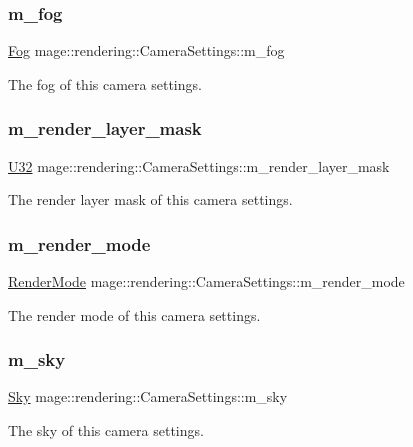 \subsubsection{\texorpdfstring{m\+\_\+fog}{m\_fog}}
{\footnotesize\ttfamily \hyperlink{classmage_1_1rendering_1_1_fog}{Fog} mage\+::rendering\+::\+Camera\+Settings\+::m\+\_\+fog\hspace{0.3cm}{\ttfamily [private]}}

The fog of this camera settings. \hypertarget{classmage_1_1rendering_1_1_camera_settings_ab6d4995fe7531563c5c5c8db1a0a1c9f}{}\label{classmage_1_1rendering_1_1_camera_settings_ab6d4995fe7531563c5c5c8db1a0a1c9f} 
\subsubsection{\texorpdfstring{m\+\_\+render\+\_\+layer\+\_\+mask}{m\_render\_layer\_mask}}
{\footnotesize\ttfamily \hyperlink{namespacemage_a41c104c036fba3756a74e19f793eeaa1}{U32} mage\+::rendering\+::\+Camera\+Settings\+::m\+\_\+render\+\_\+layer\+\_\+mask\hspace{0.3cm}{\ttfamily [private]}}

The render layer mask of this camera settings. \hypertarget{classmage_1_1rendering_1_1_camera_settings_adf563f8bd1ee5cecd126c6b4731de6e5}{}\label{classmage_1_1rendering_1_1_camera_settings_adf563f8bd1ee5cecd126c6b4731de6e5} 
\subsubsection{\texorpdfstring{m\+\_\+render\+\_\+mode}{m\_render\_mode}}
{\footnotesize\ttfamily \hyperlink{namespacemage_1_1rendering_aeb14ce7610cc9391f4e01be027b91dcc}{Render\+Mode} mage\+::rendering\+::\+Camera\+Settings\+::m\+\_\+render\+\_\+mode\hspace{0.3cm}{\ttfamily [private]}}

The render mode of this camera settings. \hypertarget{classmage_1_1rendering_1_1_camera_settings_a62c726791db2c8ee20ef404e15c5f26c}{}\label{classmage_1_1rendering_1_1_camera_settings_a62c726791db2c8ee20ef404e15c5f26c} 
\subsubsection{\texorpdfstring{m\+\_\+sky}{m\_sky}}
{\footnotesize\ttfamily \hyperlink{classmage_1_1rendering_1_1_sky}{Sky} mage\+::rendering\+::\+Camera\+Settings\+::m\+\_\+sky\hspace{0.3cm}{\ttfamily [private]}}

The sky of this camera settings. 